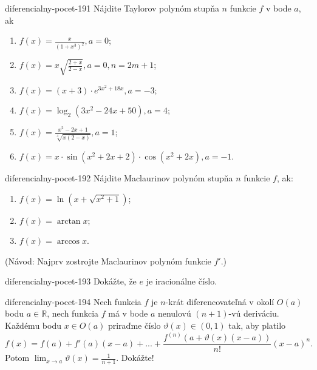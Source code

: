 \begin{defproblem}{diferencialny-pocet-191}
Nájdite Taylorov polynóm stupňa $n$ funkcie $f$ v bode $a$, ak
\begin{multicols}{2}
\begin{enumerate}
    \item $f(x)=\frac{x}{(1+x^3)^2},a=0$;
	\item $f(x)=x\sqrt{\frac{2+x}{2-x}},a=0,n=2m+1$;
	\item $f(x)=(x+3)\cdot e^{3x^2+18x},a=-3$;
	\item $f(x)=\log_2(3x^2-24x+50),a=4$;
	\item $f(x)=\frac{x^2-2x+1}{\sqrt[3]{x(2-x)}},a=1$;
	\item $f(x)=x\cdot\sin (x^2+2x+2)\cdot\cos (x^2+2x),a=-1$.
\end{enumerate}
\end{multicols}
\end{defproblem}

\begin{defproblem}{diferencialny-pocet-192}
Nájdite Maclaurinov polynóm stupňa $n$ funkcie $f$, ak:
\begin{multicols}{2}
\begin{enumerate}
	\item $f(x)=\ln (x+\sqrt{x^2+1})$;
	\item $f(x)=\arctan x$;
	\item $f(x)=\arccos x$.
\end{enumerate}
\end{multicols}
(Návod: Najprv zostrojte Maclaurinov polynóm funkcie $f'$.)
\end{defproblem}

\begin{defproblem}{diferencialny-pocet-193}
Dokážte, že $e$ je iracionálne číslo.
\end{defproblem}

\begin{defproblem}{diferencialny-pocet-194}
Nech funkcia $f$ je $n$-krát diferencovateľná v okolí $O(a)$ bodu $a\in\mathbb{R}$, nech funkcia $f$ má v bode $a$ nenulovú $(n+1)$-vú deriváciu. Každému bodu $x\in O(a)$ priraďme číslo $\vartheta (x)\in (0,1)$ tak, aby platilo
$$f(x)=f(a)+f'(a)(x-a)+...+\frac{f^{(n)}(a+\vartheta (x)(x-a))}{n!}(x-a)^n.$$
Potom $\lim_{x\rightarrow a}\vartheta (x)=\frac{1}{n+1}$. Dokážte!
\end{defproblem}

